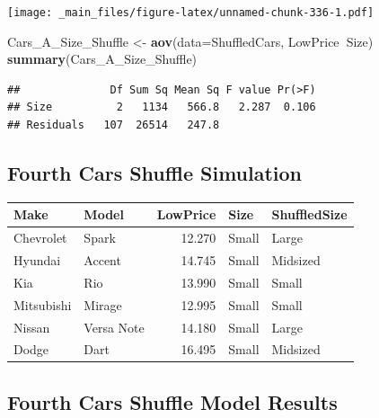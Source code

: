 \documentclass[]{book}
\newenvironment{Shaded}{\begin{snugshade}}{\end{snugshade}}
\newcommand{\KeywordTok}[1]{\textcolor[rgb]{0.13,0.29,0.53}{\textbf{#1}}}
\newcommand{\DataTypeTok}[1]{\textcolor[rgb]{0.13,0.29,0.53}{#1}}
\newcommand{\DecValTok}[1]{\textcolor[rgb]{0.00,0.00,0.81}{#1}}
\newcommand{\StringTok}[1]{\textcolor[rgb]{0.31,0.60,0.02}{#1}}
\newcommand{\OperatorTok}[1]{\textcolor[rgb]{0.81,0.36,0.00}{\textbf{#1}}}
\newcommand{\NormalTok}[1]{#1}
\begin{document}
\texttt{[image: \_main\_files/figure-latex/unnamed-chunk-336-1.pdf]}

\begin{Shaded}
\begin{Highlighting}[]
\NormalTok{Cars_A_Size_Shuffle <-}\StringTok{ }\KeywordTok{aov}\NormalTok{(}\DataTypeTok{data=}\NormalTok{ShuffledCars, LowPrice}\OperatorTok{~}\NormalTok{Size)}
\KeywordTok{summary}\NormalTok{(Cars_A_Size_Shuffle)}
\end{Highlighting}
\end{Shaded}

\begin{verbatim}
##              Df Sum Sq Mean Sq F value Pr(>F)
## Size          2   1134   566.8   2.287  0.106
## Residuals   107  26514   247.8
\end{verbatim}

\subsection{Fourth Cars Shuffle
Simulation}\label{fourth-cars-shuffle-simulation-1}

\begin{Shaded}
\end{Shaded}

\begin{tabular}{l|l|r|l|l}
\hline
Make & Model & LowPrice & Size & ShuffledSize\\
\hline
Chevrolet & Spark & 12.270 & Small & Large\\
\hline
Hyundai & Accent & 14.745 & Small & Midsized\\
\hline
Kia & Rio & 13.990 & Small & Small\\
\hline
Mitsubishi & Mirage & 12.995 & Small & Small\\
\hline
Nissan & Versa Note & 14.180 & Small & Large\\
\hline
Dodge & Dart & 16.495 & Small & Midsized\\
\hline
\end{tabular}

\subsection{Fourth Cars Shuffle Model
Results}\label{fourth-cars-shuffle-model-results-1}
\end{document}

